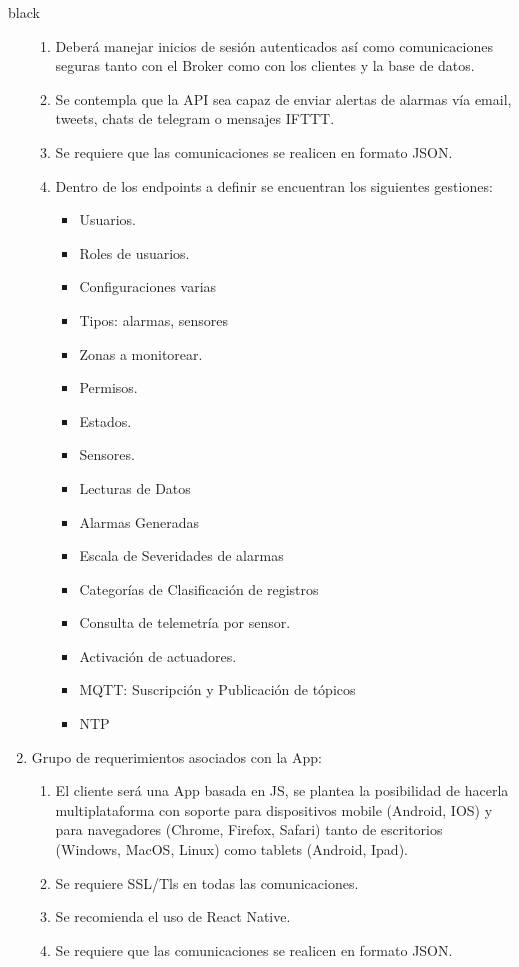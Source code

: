 \documentclass[11pt]{charter}
\begin{document}
\begin{consigna}{black}
\begin{enumerate}
\begin{enumerate}
		\item Deberá manejar inicios de sesión autenticados así como comunicaciones seguras tanto con el Broker como con los clientes y la base de datos.
		\item Se contempla que la API sea capaz de enviar alertas de alarmas vía email, tweets, chats de telegram o mensajes IFTTT.
		\item Se requiere que las comunicaciones se realicen en formato JSON.
		\item Dentro de los endpoints a definir se encuentran los siguientes gestiones:
		\begin{itemize}
		\item Usuarios.
		\item Roles de usuarios.
		\item Configuraciones varias
		\item Tipos: alarmas, sensores
		\item Zonas a monitorear.
		\item Permisos.
		\item Estados.
		\item Sensores.
		\item Lecturas de Datos
		\item Alarmas Generadas
		\item Escala de Severidades de alarmas
		\item Categorías de Clasificación de registros
		\item Consulta de telemetría por sensor.
		\item Activación de actuadores.
		\item MQTT: Suscripción y Publicación de tópicos
		\item NTP
		\end{itemize}
	\end{enumerate}	
\item Grupo de requerimientos asociados con la App:
	\begin{enumerate}
		\item El cliente será una App basada en JS, se plantea la posibilidad de hacerla multiplataforma con soporte para dispositivos mobile (Android, IOS) y para navegadores (Chrome, Firefox, Safari) tanto de escritorios (Windows, MacOS, Linux) como tablets (Android, Ipad). 
		\item Se requiere SSL/Tls en todas las comunicaciones.
		\item Se recomienda el uso de React Native.
		\item Se requiere que las comunicaciones se realicen en formato JSON.

\end{enumerate}
\end{enumerate}
\end{consigna}
\end{document}

